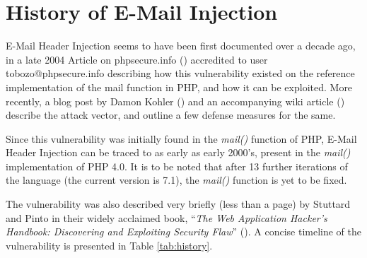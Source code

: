 \section{History of E-Mail Injection}

E-Mail Header Injection seems to have been first documented over a decade ago, in a late 2004 Article on phpsecure.info (\cite{Tobozo}) accredited to user tobozo@phpsecure.info describing how this vulnerability existed on the reference implementation of the mail function in PHP, and how it can be exploited. More recently, a blog post by Damon Kohler (\cite{DK}) and an accompanying wiki article (\cite{Injection}) describe the attack vector, and outline a few defense measures for the same.

Since this vulnerability was initially found in the \emph{mail()} function of PHP, E-Mail Header Injection can be traced to as early as early 2000's, present in the \emph{mail()} implementation of PHP 4.0. It is to be noted that after 13 further iterations of the language (the current version is 7.1), the \emph{mail()} function is yet to be fixed.

The vulnerability was also described very briefly (less than a page) by Stuttard and Pinto in their widely acclaimed book, ``\emph{The Web Application Hacker's Handbook: Discovering and Exploiting Security Flaw}'' (\cite{stuttard2011web}). 
A concise timeline of the vulnerability is presented in Table \ref{tab:history}.



